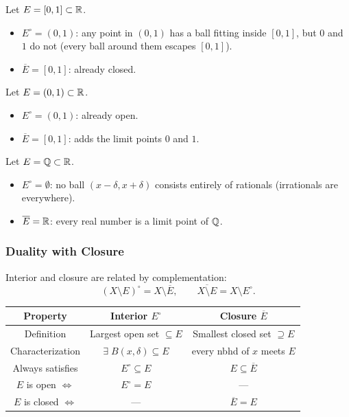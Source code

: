 \documentclass[../master/master.tex]{subfiles}
\begin{document}
\begin{example}
Let $E = [0, 1] \subset \mathbb{R}$.
\begin{itemize}
    \item $E^\circ = (0, 1)$: any point in $(0,1)$ has a ball fitting inside $[0,1]$, but $0$ and $1$ do not (every ball around them escapes $[0,1]$).
    \item $\overline{E} = [0, 1]$: already closed.
\end{itemize}

Let $E = (0, 1) \subset \mathbb{R}$.
\begin{itemize}
    \item $E^\circ = (0, 1)$: already open.
    \item $\overline{E} = [0, 1]$: adds the limit points $0$ and $1$.
\end{itemize}

Let $E = \mathbb{Q} \subset \mathbb{R}$.
\begin{itemize}
    \item $E^\circ = \emptyset$: no ball $(x - \delta, x + \delta)$ consists entirely of rationals (irrationals are everywhere).
    \item $\overline{E} = \mathbb{R}$: every real number is a limit point of $\mathbb{Q}$.
\end{itemize}
\end{example}

\subsubsection*{Duality with Closure}

Interior and closure are related by complementation:
\[
    (X \setminus E)^\circ = X \setminus \overline{E}, \qquad \overline{X \setminus E} = X \setminus E^\circ.
\]

\begin{center}
\renewcommand{\arraystretch}{1.3}
\begin{tabular}{|c|c|c|}
\hline
\textbf{Property} & \textbf{Interior $E^\circ$} & \textbf{Closure $\overline{E}$} \\
\hline
Definition & Largest open set $\subseteq E$ & Smallest closed set $\supseteq E$ \\
Characterization & $\exists\; B(x,\delta) \subseteq E$ & every nbhd of $x$ meets $E$ \\
Always satisfies & $E^\circ \subseteq E$ & $E \subseteq \overline{E}$ \\
$E$ is open $\iff$ & $E^\circ = E$ & --- \\
$E$ is closed $\iff$ & --- & $\overline{E} = E$ \\
\hline
\end{tabular}
\end{center}
\end{document}

